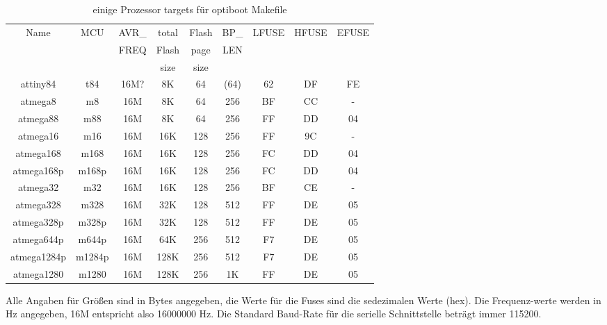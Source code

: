 \begin{table}[H]
  \begin{center}
    \begin{tabular}{| c | c | c | c | c | c | c | c | c |}
    \hline
             Name  & MCU & AVR\_ & total & Flash & BP\_ & LFUSE & HFUSE & EFUSE  \\
                   &     & FREQ  & Flash & page  & LEN  &       &       &        \\
                   &     &       &  size & size  &      &       &       &        \\
    \hline
    \hline
         attiny84 & t84   & 16M? &  8K   &  64   & (64) &  62   &  DF   & FE \\
    \hline
         atmega8  & m8    & 16M  &  8K   &  64   & 256  &  BF   &  CC   &  - \\
    \hline
         atmega88 & m88   & 16M  &  8K   &  64   & 256  &  FF   &  DD   &  04 \\
    \hline
       atmega16   & m16   & 16M  &  16K  & 128   & 256  &  FF   &  9C   &  - \\
    \hline
       atmega168  &  m168  & 16M  &  16K & 128   & 256  &  FC   &  DD   &  04 \\
       atmega168p &  m168p & 16M  &  16K & 128   & 256  &  FC   &  DD   &  04 \\
    \hline
       atmega32   &  m32   & 16M  &  16K & 128   & 256  &  BF   &  CE   &  - \\
    \hline
       atmega328  &  m328  & 16M  &  32K & 128   & 512  &  FF   &  DE   &  05 \\
       atmega328p & m328p & 16M  &  32K  & 128   & 512  &  FF   &  DE   &  05 \\
    \hline
       atmega644p & m644p & 16M  &  64K  & 256   & 512  &  F7   &  DE   &  05 \\
    \hline
     atmega1284p & m1284p & 16M  & 128K  & 256   & 512  &  F7   &  DE   &  05 \\
    \hline
     atmega1280  & m1280  & 16M  &  128K & 256   & 1K   &  FF   &  DE   &  05 \\
    \hline
    \end{tabular}
  \end{center}
  \caption{einige Prozessor targets für optiboot Makefile}
  \label{tab:processors}
\end{table}

Alle Angaben für Größen sind in Bytes angegeben, die Werte für die Fuses sind die sedezimalen
Werte (hex). Die Frequenz-werte werden in Hz angegeben, 16M entspricht also 16000000 Hz.
Die Standard Baud-Rate für die serielle Schnittstelle beträgt immer 115200.

